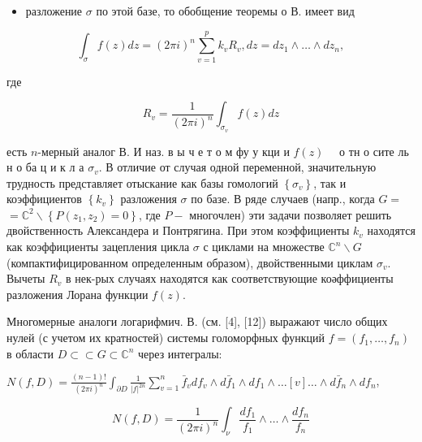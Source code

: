 \documentclass[10pt]{article}
\begin{document}
\begin{itemize}

  \item разложение $\sigma$ по этой базе, то обобщение теоремы о В. имеет вид

\end{itemize}



\[

\int_{\sigma} f(z) d z=(2 \pi i)^{n} \sum_{v=1}^{p} k_{v} R_{v}, d z=d z_{1} \wedge \ldots \wedge d z_{n},

\]



где



\[

R_{v}=\frac{1}{(2 \pi i)^{n}} \int_{\sigma_{v}} f(z) d z

\]



есть $n$-мерный аналог В. И наз. в ы ч е т о м фу у кци и $f(z) \quad$ о тн о сите ль н о ба ц и к л а $\sigma_{v}$. В отличие от случая одной переменной, значительную трудность представляет отыскание как базы гомологий $\left\{\sigma_{v}\right\}$, так и коэффициентов $\left\{k_{v}\right\}$ разложения $\sigma$ по базе. В ряде случаев (напр., когда $G=$ $=\mathbb{C}^{2} \backslash\left\{P\left(z_{1}, z_{2}\right)=0\right\}$, где $P-$ многочлен) эти задачи позволяет решить двойственность Александера и Понтрягина. При этом коэффициенты $k_{v}$ находятся как коэффициенты зацепления цикла $\sigma$ с циклами на множестве $\mathbb{C}^{n} \backslash G$ (компактифицированном определенным образом), двойственными циклам $\sigma_{v}$. Вычеты $R_{v}$ в нек-рых случаях находятся как соответствующие коәффициенты разложения Лорана функции $f(z)$.



Многомерные аналоги логарифмич. В. (см. [4], [12]) выражают число общих нулей (с учетом их кратностей) системы голоморфных функций $f=\left(f_{1}, \ldots, f_{n}\right)$ в области $D \subset \subset G \subset \mathbb{C}^{n}$ через интегралы:



$N(f, D)=\frac{(n-1) !}{(2 \pi i)^{n}} \int_{\partial D} \frac{1}{|f|^{2 n}} \sum_{v=1}^{n} \bar{f}_{v} d f_{v} \wedge d \bar{f}_{1} \wedge d f_{1} \wedge \ldots[v] \ldots \wedge d \bar{f}_{n} \wedge d f_{n}$,



\[

N(f, D)=\frac{1}{(2 \pi i)^{n}} \int_{\nu} \frac{d f_{1}}{f_{1}} \wedge \ldots \wedge \frac{d f_{n}}{f_{n}}

\]
\end{document}

